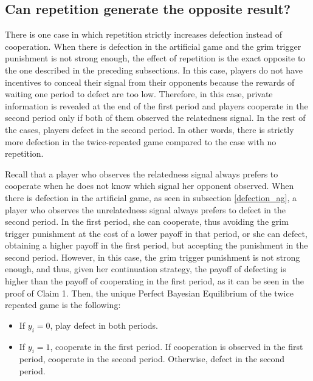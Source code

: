 \documentclass[12pt]{article}
\begin{document}
\subsection{Can repetition generate the opposite result?}

There is one case in which repetition strictly increases defection instead of cooperation. When there is defection in the artificial game and the grim trigger punishment is not strong enough, the effect of repetition is the exact opposite to the one described in the preceding subsections. In this case, players do not have incentives to conceal their signal from their opponents because the rewards of waiting one period to defect are too low. Therefore, in this case, private information is revealed at the end of the first period and players cooperate in the second period only if both of them observed the relatedness signal. In the rest of the cases, players defect in the second period. In other words, there is strictly more defection in the twice-repeated game compared to the case with no repetition.

Recall that a player who observes the relatedness signal always prefers to cooperate when he does not know which signal her opponent observed. When there is defection in the artificial game, as seen in subsection \ref{defection_ag}, a player who observes the unrelatedness signal always prefers to defect in the second period. In the first period, she can cooperate, thus avoiding the grim trigger punishment at the cost of a lower payoff in that period, or she can defect, obtaining a higher payoff in the first period, but accepting the punishment in the second period. However, in this case, the grim trigger punishment is not strong enough, and thus, given her continuation strategy, the payoff of defecting is higher than the payoff of cooperating in the first period, as it can be seen in the proof of Claim 1. Then, the unique Perfect Bayesian Equilibrium of the twice repeated game is the following:

\begin{itemize}
	\item{If $y_{i}=0$, play defect in both periods.}
  \item{If $y_{i}=1$, cooperate in the first period. If cooperation is observed in the first period, cooperate in the second period. Otherwise, defect in the second period.}
\end{itemize}

\end{document}
